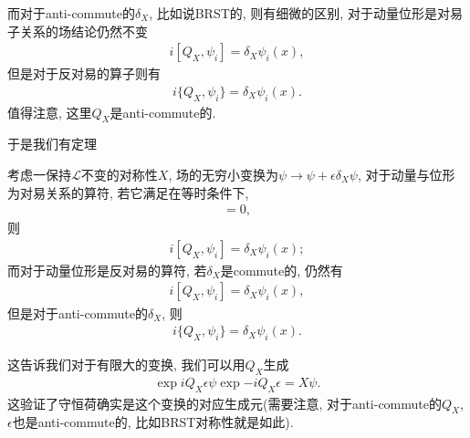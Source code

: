 而对于anti-commute的$\delta_X$, 比如说BRST的, 则有细微的区别, 对于动量位形是对易子关系的场结论仍然不变
\begin{align}
    i[Q_X, \psi_i]=\delta_X\psi_i(x),
\end{align}
但是对于反对易的算子则有
\begin{align}
    i\{Q_X, \psi_i\}=\delta_X\psi_i(x).
\end{align}
值得注意, 这里$Q_X$是anti-commute的.

于是我们有定理
\begin{theorem}\label{conserved-charge-as-generator}
    考虑一保持$\mathcal L$不变的对称性$X$, 场的无穷小变换为$\psi\to\psi+\epsilon\delta_X\psi$, 对于动量与位形为对易关系的算符, 若它满足在等时条件下, 
    \begin{align}
        [\delta_X\psi_j(y), \psi_i(x)]=0,
    \end{align}
    则
    \begin{align}
        i[Q_X, \psi_i]=\delta_X\psi_i(x);
    \end{align}
    而对于动量位形是反对易的算符, 若$\delta_X$是commute的, 仍然有
    \begin{align}
        i[Q_X, \psi_i]=\delta_X\psi_i(x),
    \end{align}
    但是对于anti-commute的$\delta_X$, 则
    \begin{align}
        i\{Q_X, \psi_i\}=\delta_X\psi_i(x).
    \end{align}
\end{theorem}

这告诉我们对于有限大的变换, 我们可以用$Q_X$生成
\begin{align}
    \exp{iQ_X\epsilon}\psi\exp{-iQ_X\epsilon}=X\psi.
\end{align}
这验证了守恒荷确实是这个变换的对应生成元(需要注意, 对于anti-commute的$Q_X$, $\epsilon$也是anti-commute的, 比如BRST对称性就是如此).
